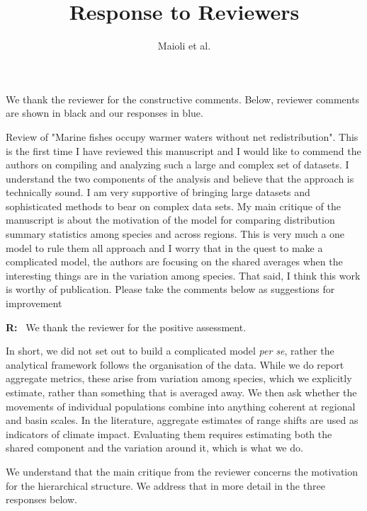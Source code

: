 \documentclass[11pt]{article}
\title{Response to Reviewers}
\author{Maioli et al.}
\date{}
\newcommand{\reviewer}[1]{\par\medskip\noindent\textcolor{revcolor}{#1}\par}
\newenvironment{reply}
{\par\smallskip\begingroup\color{replycolor}\noindent\textbf{R:}\ }
{\endgroup\par\medskip}
\begin{document}
\maketitle

\noindent We thank the reviewer for the constructive comments.
Below, reviewer comments are shown in \textcolor{revcolor}{black} and our responses in \textcolor{replycolor}{blue}.

\reviewer{Review of "Marine fishes occupy warmer waters without net redistribution". This is the first time I have reviewed this manuscript and I would like to commend the authors on compiling and analyzing such a large and complex set of datasets. I understand the two components of the analysis and believe that the approach is technically sound. I am very supportive of bringing large datasets and sophisticated methods to bear on complex data sets. My main critique of the manuscript is about the motivation of the model for comparing distribution summary statistics among species and across regions. This is very much a one model to rule them all approach and I worry that in the quest to make a complicated model, the authors are focusing on the shared averages when the interesting things are in the variation among species. That said, I think this work is worthy of publication. Please take the comments below as suggestions for improvement}

\begin{reply}
We thank the reviewer for the positive assessment. 

In short, we did not set out to build a complicated model \textit{per se}, rather the analytical framework follows the organisation of the data. While we do report aggregate metrics, these arise from variation among species, which we explicitly estimate, rather than something that is averaged away. We then ask whether the movements of individual populations combine into anything coherent at regional and basin scales. In the literature, aggregate estimates of range shifts are used as indicators of climate impact. Evaluating them requires estimating both the shared component and the variation around it, which is what we do.

We understand that the main critique from the reviewer concerns the motivation for the hierarchical structure. We address that in more detail in the three responses below.
\end{reply}
\end{document}
